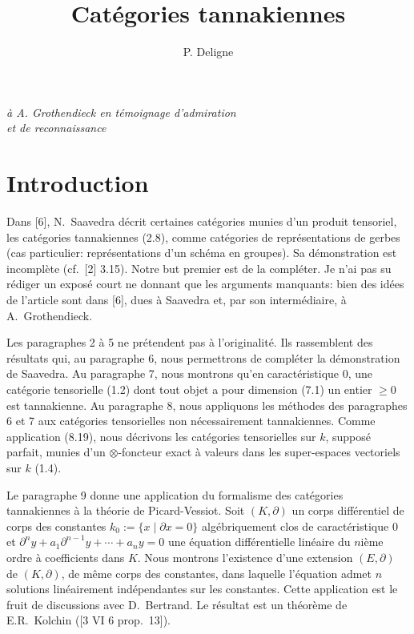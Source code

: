 \documentclass[12pt,a4paper]{article}
\title{\textbf{Catégories tannakiennes}}
\author{P. Deligne}
\date{}
\theoremstyle{plain}
\theoremstyle{definition}
\theoremstyle{remark}
\begin{document}
\maketitle

\begin{center}
\textit{à A. Grothendieck en témoignage d'admiration}\\
\textit{et de reconnaissance}
\end{center}

\tableofcontents

\section{Introduction}

Dans [6], N.~Saavedra décrit certaines catégories munies d'un produit tensoriel, les catégories tannakiennes (2.8), comme catégories de représentations de gerbes (cas particulier: représentations d'un schéma en groupes). Sa démonstration est incomplète (cf.~[2] 3.15). Notre but premier est de la compléter. Je n'ai pas su rédiger un exposé court ne donnant que les arguments manquants: bien des idées de l'article sont dans [6], dues à Saavedra et, par son intermédiaire, à A.~Grothendieck.

Les paragraphes 2 à 5 ne prétendent pas à l'originalité. Ils rassemblent des résultats qui, au paragraphe 6, nous permettrons de compléter la démonstration de Saavedra. Au paragraphe 7, nous montrons qu'en caractéristique 0, une catégorie tensorielle (1.2) dont tout objet a pour dimension (7.1) un entier $\geq 0$ est tannakienne. Au paragraphe 8, nous appliquons les méthodes des paragraphes 6 et 7 aux catégories tensorielles non nécessairement tannakiennes. Comme application (8.19), nous décrivons les catégories tensorielles sur $k$, supposé parfait, munies d'un $\otimes$-foncteur exact à valeurs dans les super-espaces vectoriels sur $k$ (1.4).

Le paragraphe 9 donne une application du formalisme des catégories tannakiennes à la théorie de Picard-Vessiot. Soit $(K,\partial)$ un corps différentiel de corps des constantes $k_0 := \{x \mid \partial x = 0\}$ algébriquement clos de caractéristique 0 et $\partial^n y + a_1 \partial^{n-1} y + \cdots + a_n y = 0$ une équation différentielle linéaire du $n$ième ordre à coefficients dans $K$. Nous montrons l'existence d'une extension $(E,\partial)$ de $(K,\partial)$, de même corps des constantes, dans laquelle l'équation admet $n$ solutions linéairement indépendantes sur les constantes. Cette application est le fruit de discussions avec D.~Bertrand. Le résultat est un théorème de E.R.~Kolchin ([3 VI 6 prop.~13]).
\end{document}

